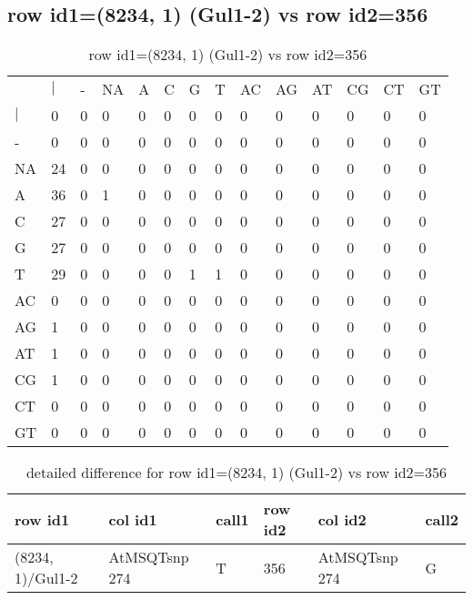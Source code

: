 \subsection{row id1=(8234, 1) (Gul1-2) vs row id2=356}
\begin{center}
\begin{longtable}{|l|l|l|l|l|l|l|l|l|l|l|l|l|l|}
\caption{row id1=(8234, 1) (Gul1-2) vs row id2=356} \label{table_dm164}\\
\hline
\\
\hline
&$|$&-&NA&A&C&G&T&AC&AG&AT&CG&CT&GT\\
$|$&0&0&0&0&0&0&0&0&0&0&0&0&0\\
-&0&0&0&0&0&0&0&0&0&0&0&0&0\\
NA&24&0&0&0&0&0&0&0&0&0&0&0&0\\
A&36&0&1&0&0&0&0&0&0&0&0&0&0\\
C&27&0&0&0&0&0&0&0&0&0&0&0&0\\
G&27&0&0&0&0&0&0&0&0&0&0&0&0\\
T&29&0&0&0&0&1&1&0&0&0&0&0&0\\
AC&0&0&0&0&0&0&0&0&0&0&0&0&0\\
AG&1&0&0&0&0&0&0&0&0&0&0&0&0\\
AT&1&0&0&0&0&0&0&0&0&0&0&0&0\\
CG&1&0&0&0&0&0&0&0&0&0&0&0&0\\
CT&0&0&0&0&0&0&0&0&0&0&0&0&0\\
GT&0&0&0&0&0&0&0&0&0&0&0&0&0\\
\hline
\end{longtable}
\end{center}

\begin{center}
\begin{longtable}{|l|l|l|l|l|l|}
\caption{detailed difference for row id1=(8234, 1) (Gul1-2) vs row id2=356} \label{table_dm165}\\
\hline
row id1&col id1&call1&row id2&col id2&call2\\
\hline
(8234, 1)/Gul1-2&AtMSQTsnp 274&T&356&AtMSQTsnp 274&G\\
\hline
\end{longtable}
\end{center}

